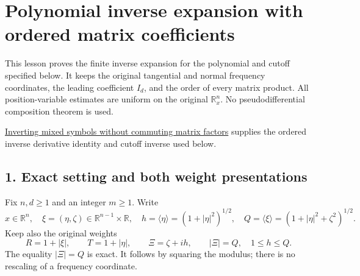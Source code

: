 \documentclass[
  11pt,
]{article}
\author{}
\date{}
\makeatletter
\let\ReaderOriginalAnchorStart\hyper@anchorstart
\let\ReaderOriginalAnchorEnd\hyper@anchorend
\let\ReaderPendingAliases\@empty
\def\ReaderArmAliases#1{\gdef\ReaderPendingAliases{#1}}
\def\hyper@anchorstart#1{\ReaderIfNativeAnchorTF{#1}{\ReaderPendingAliases\global\let\ReaderPendingAliases\@empty}{}\ReaderOriginalAnchorStart{#1}}
\makeatother
\begin{document}
\ReaderArmAliases{\ReaderOriginalAnchorStart{polynomial-inverse-expansion-with-ordered-matrix-coefficients}\ReaderOriginalAnchorEnd}
\section{Polynomial inverse expansion with ordered matrix
coefficients}\label{polynomial-inverse-expansion-with-ordered-matrix-coefficients}

This lesson proves the finite inverse expansion for the polynomial and
cutoff specified below. It keeps the original tangential and normal
frequency coordinates, the leading coefficient \(I_d\), and the order of
every matrix product. All position-variable estimates are uniform on the
original \(\mathbb R_x^n\). No pseudodifferential composition theorem is
used.

\href{mixed-symbol-inversion.pdf}{Inverting mixed symbols without
commuting matrix factors} supplies the ordered inverse derivative
identity and cutoff inverse used below.

\ReaderArmAliases{\ReaderOriginalAnchorStart{AN03-PIN-001}\ReaderOriginalAnchorEnd\begingroup\expandafter\def\csname @currentHref\endcsname{AN03-PIN-001}\label{AN03-PIN-001}\endgroup\ReaderOriginalAnchorStart{an03-pin-001-exact-setting-and-both-weight-presentations}\ReaderOriginalAnchorEnd\begingroup\expandafter\def\csname @currentHref\endcsname{an03-pin-001-exact-setting-and-both-weight-presentations}\label{an03-pin-001-exact-setting-and-both-weight-presentations}\endgroup\ReaderOriginalAnchorStart{1-exact-setting-and-both-weight-presentations}\ReaderOriginalAnchorEnd\begingroup\expandafter\def\csname @currentHref\endcsname{1-exact-setting-and-both-weight-presentations}\label{1-exact-setting-and-both-weight-presentations}\endgroup}
\subsection{1. Exact setting and both weight
presentations}\label{exact-setting-and-both-weight-presentations}

Fix \(n,d\geq1\) and an integer \(m\geq1\). Write \[
 x\in\mathbb R^n,\quad \xi=(\eta,\zeta)\in\mathbb R^{n-1}\times\mathbb R,\quad
 h=\langle\eta\rangle=(1+|\eta|^2)^{1/2},\quad
 Q=\langle\xi\rangle=(1+|\eta|^2+\zeta^2)^{1/2}.
 \tag{PI1}
\] Keep also the original weights \[
 R=1+|\xi|,\qquad T=1+|\eta|,\qquad
 \Xi=\zeta+ih,\qquad |\Xi|=Q,\quad 1\leq h\leq Q.
 \tag{PI2}
\] The equality \(|\Xi|=Q\) is exact. It follows by squaring the
modulus; there is no rescaling of a frequency coordinate.
\end{document}

